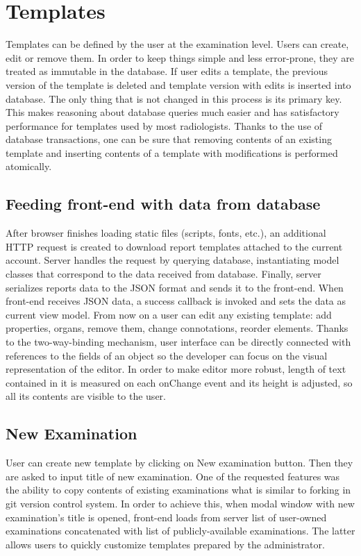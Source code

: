 \documentclass[12pt, twoside, openany]{report}
\theoremstyle{definition}
\begin{document}
\section{Templates}
Templates can be defined by the user at the examination level. Users can create, edit or remove them. In order to keep things simple and less error-prone, they are treated as immutable in the database. If user edits a template, the previous version of the template is deleted and template version with edits is inserted into database. The only thing that is not changed in this process is its primary key. This makes reasoning about database queries much easier and has satisfactory performance for templates used by most radiologists. Thanks to the use of database transactions, one can be sure that removing contents of an existing template and inserting contents of a template with modifications is performed atomically.


\subsection{Feeding front-end with data from database}\label{templates-immutable}
After browser finishes loading static files (scripts, fonts, etc.), an additional HTTP request is created to download report templates attached to the current account. Server handles the request by querying database, instantiating model classes that correspond to the data received from database. Finally, server serializes reports data to the JSON format and sends it to the front-end. When front-end receives JSON data, a success callback is invoked and sets the data as current view model. 
From now on a user can edit any existing template: add properties, organs, remove them, change connotations, reorder elements. Thanks to the two-way-binding mechanism, user interface can be directly connected with references to the fields of an object so the developer can focus on the visual representation of the editor. In order to make editor more robust, length of text contained in it is measured on each onChange event and its height is adjusted, so all its contents are visible to the user.
\subsection{New Examination}
User can create new template by clicking on New examination button. Then they are asked to input title of new examination. One of the requested features was the ability to copy contents of existing examinations what is similar to forking in git version control system. In order to achieve this, when modal window with new examination's title is opened, front-end loads from server list of user-owned examinations concatenated with list of publicly-available examinations. The latter allows users to quickly customize templates prepared by the administrator.
\end{document}
